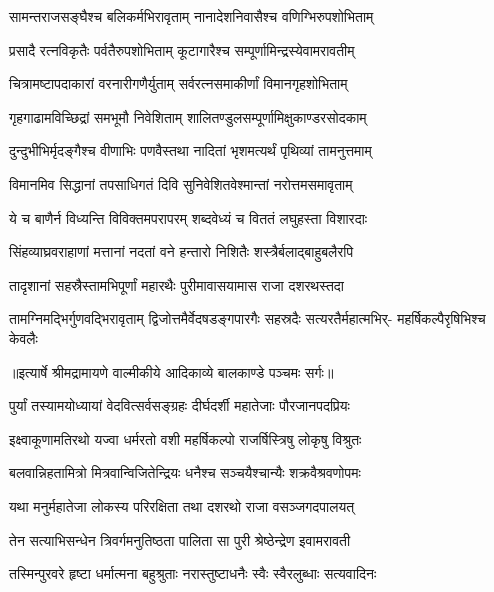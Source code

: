 \twolineshloka
{सामन्तराजसङ्घैश्च बलिकर्मभिरावृताम्}
{नानादेशनिवासैश्च वणिग्भिरुपशोभिताम्} %

\twolineshloka
{प्रसादै रत्नविकृतैः पर्वतैरुपशोभिताम्}
{कूटागारैश्च सम्पूर्णामिन्द्रस्येवामरावतीम्} %

\twolineshloka
{चित्रामष्टापदाकारां वरनारीगणैर्युताम्}
{सर्वरत्नसमाकीर्णां विमानगृहशोभिताम्} %

\twolineshloka
{गृहगाढामविच्छिद्रां समभूमौ निवेशिताम्}
{शालितण्डुलसम्पूर्णामिक्षुकाण्डरसोदकाम्} %

\twolineshloka
{दुन्दुभीभिर्मृदङ्गैश्च वीणाभिः पणवैस्तथा}
{नादितां भृशमत्यर्थं पृथिव्यां तामनुत्तमाम्} %

\twolineshloka
{विमानमिव सिद्धानां तपसाधिगतं दिवि}
{सुनिवेशितवेश्मान्तां नरोत्तमसमावृताम्} %

\twolineshloka
{ये च बाणैर्न विध्यन्ति विविक्तमपरापरम्}
{शब्दवेध्यं च विततं लघुहस्ता विशारदाः} %

\twolineshloka
{सिंहव्याघ्रवराहाणां मत्तानां नदतां वने}
{हन्तारो निशितैः शस्त्रैर्बलाद्बाहुबलैरपि} %

\twolineshloka
{तादृशानां सहस्रैस्तामभिपूर्णां महारथैः}
{पुरीमावासयामास राजा दशरथस्तदा} %

\fourlineindentedshloka
{तामग्निमद्भिर्गुणवद्भिरावृताम्}
{द्विजोत्तमैर्वेदषडङ्गपारगैः}
{सहस्रदैः सत्यरतैर्महात्मभिर्-}
{महर्षिकल्पैरृषिभिश्च केवलैः} %


{॥इत्यार्षे श्रीमद्रामायणे वाल्मीकीये आदिकाव्ये बालकाण्डे पञ्चमः सर्गः॥}


\twolineshloka
{पुर्यां तस्यामयोध्यायां वेदवित्सर्वसङ्ग्रहः}
{दीर्घदर्शी महातेजाः पौरजानपदप्रियः} %

\twolineshloka
{इक्ष्वाकूणामतिरथो यज्वा धर्मरतो वशी}
{महर्षिकल्पो राजर्षिस्त्रिषु लोकृषु विश्रुतः} %

\twolineshloka
{बलवान्निहतामित्रो मित्रवान्विजितेन्द्रियः}
{धनैश्च सञ्चयैश्चान्यैः शक्रवैश्रवणोपमः} %

\twolineshloka
{यथा मनुर्महातेजा लोकस्य परिरक्षिता}
{तथा दशरथो राजा वसञ्जगदपालयत्} %

\twolineshloka
{तेन सत्याभिसन्धेन त्रिवर्गमनुतिष्ठता}
{पालिता सा पुरी श्रेष्ठेन्द्रेण इवामरावती} %

\twolineshloka
{तस्मिन्पुरवरे हृष्टा धर्मात्मना बहुश्रुताः}
{नरास्तुष्टाधनैः स्वैः स्वैरलुब्धाः सत्यवादिनः} %

